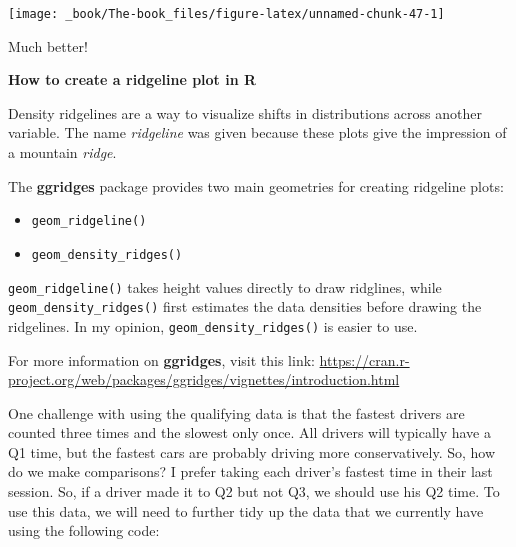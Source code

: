 \documentclass[
]{book}
\providecommand{\tightlist}{%
  \setlength{\itemsep}{0pt}\setlength{\parskip}{0pt}}
\begin{document}
\begin{center}\texttt{[image: \_book/The-book\_files/figure-latex/unnamed-chunk-47-1]} \end{center}

Much better!

\begin{blackbox}

\begin{center}
\textbf{How to create a ridgeline plot in R}

\end{center}

Density ridgelines are a way to visualize shifts in distributions across another variable. The name \emph{ridgeline} was given because these plots give the impression of a mountain \emph{ridge}.

The \textbf{ggridges} package provides two main geometries for creating ridgeline plots:

\begin{itemize}
\tightlist
\item
  \texttt{geom\_ridgeline()}
\item
  \texttt{geom\_density\_ridges()}
\end{itemize}

\texttt{geom\_ridgeline()} takes height values directly to draw ridglines, while \texttt{geom\_density\_ridges()} first estimates the data densities before drawing the ridgelines. In my opinion, \texttt{geom\_density\_ridges()} is easier to use.

For more information on \textbf{ggridges}, visit this link: \url{https://cran.r-project.org/web/packages/ggridges/vignettes/introduction.html}

\end{blackbox}

One challenge with using the qualifying data is that the fastest drivers are counted three times and the slowest only once. All drivers will typically have a Q1 time, but the fastest cars are probably driving more conservatively. So, how do we make comparisons? I prefer taking each driver's fastest time in their last session. So, if a driver made it to Q2 but not Q3, we should use his Q2 time. To use this data, we will need to further tidy up the data that we currently have using the following code:
\end{document}
